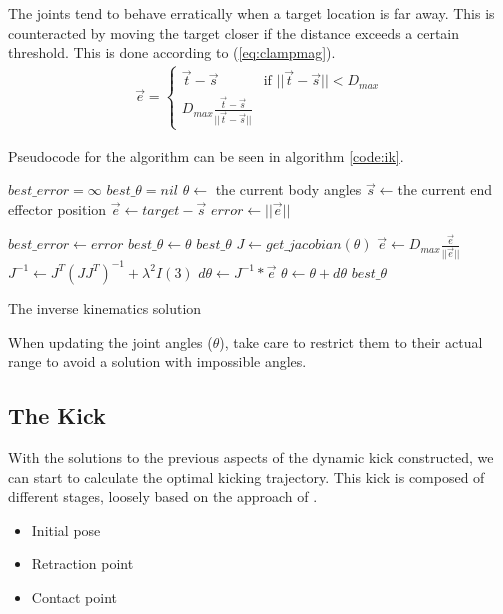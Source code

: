 \documentclass[a4paper]{article}
\begin{document}
The joints tend to behave erratically when a target location is far away. This
is counteracted by moving the target closer if the distance exceeds a certain
threshold. This is done according to (\ref{eq:clampmag}).
\begin{align}
  \vec{e} = \begin{cases}
    \vec{t} - \vec{s} & \text{if } ||\vec{t} - \vec{s}|| < D_{max} \\
    D_{max} \frac{\vec{t} - \vec{s}}{||\vec{t} - \vec{s}||}
  \end{cases}      \label{eq:clampmag}
\end{align}

Pseudocode for the algorithm can be seen in algorithm \ref{code:ik}.

\begin{algorithm}
  \begin{algorithmic}
      \State $best\_error = \infty$
      \State $best\_\theta = nil$
      \State $\theta \gets$ the current body angles
        \State $\vec{s} \gets $the current end effector position
        \State $\vec{e} \gets target - \vec{s}$
        \State $error \gets ||\vec{e}||$

          \State $best\_error \gets error$
          \State $best\_\theta \gets \theta$
        \EndIf
          \State \Return $best\_\theta$
        \Else
          \State $J \gets get\_jacobian(\theta)$
            \State $\vec{e} \gets D_{max} \frac{\vec{e}}{||\vec{e}||}$
          \EndIf
          \State $J^{-1} \gets J^T (J J^T)^{-1} + \lambda^2 I(3)$
          \State $d\theta \gets J^{-1} * \vec{e}$
          \State $\theta \gets \theta + d\theta$
        \EndIf
      \EndWhile
      \State \Return $best\_\theta$
    \EndFunction
  \end{algorithmic}
  \caption{The inverse kinematics solution}
  \label{code:ik}
\end{algorithm}

When updating the joint angles ($\theta$), take care to restrict them to their
actual range to avoid a solution with impossible angles.

\subsection{The Kick}
\label{sec:kick}
With the solutions to the previous aspects of the dynamic kick constructed, 
we can start to calculate the optimal kicking trajectory. This kick is composed
of different stages, loosely based on the approach of \cite{Xu2010}. 
\begin{itemize}
    \item Initial pose
    \item Retraction point
    \item Contact point
\end{itemize}
\end{document}
